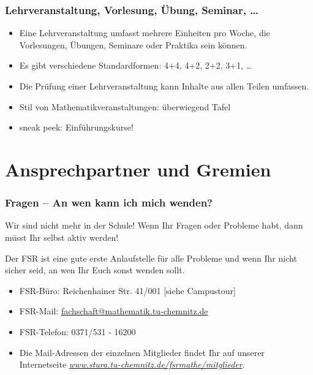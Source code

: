 \documentclass[10pt]{beamer}
\begin{document}
\begin{frame}
\frametitle{Lehrveranstaltung, Vorlesung, Übung, Seminar, \ldots}
\begin{itemize}
	\item Eine Lehrveranstaltung umfasst mehrere Einheiten pro Woche, die Vorlesungen, Übungen, Seminare oder Praktika sein können. 
	\item Es gibt verschiedene Standardformen: 4+4, 4+2, 2+2, 3+1, \ldots
	\item Die Prüfung einer Lehrveranstaltung kann Inhalte aus allen Teilen umfassen.
	\item Stil von Mathematikveranstaltungen: überwiegend Tafel
	\item sneak peek: Einführungskurse!
\end{itemize}
\end{frame}

\section{Ansprechpartner und Gremien}
\frame{\tableofcontents[currentsection]}

\begin{frame}
\frametitle{Fragen -- An wen kann ich mich wenden?}
Wir sind nicht mehr in der Schule! Wenn Ihr Fragen oder Probleme habt, dann müsst Ihr selbst aktiv werden!
\begin{block}{\vphantom{X}}
	Der FSR ist eine gute erste Anlaufstelle für alle Probleme und wenn Ihr nicht sicher seid, an wen Ihr Euch sonst wenden sollt.
\end{block}
\begin{itemize}
	\item FSR-Büro: Reichenhainer Str. 41/001 [siehe Campustour]
	\item FSR-Mail: \href{mailto:fachschaft@mathematik.tu-chemnitz.de}{fachschaft@mathematik.tu-chemnitz.de} 
	\item FSR-Telefon: 0371/531 - 16200
	\item Die Mail-Adressen der einzelnen Mitglieder findet Ihr auf unserer Internetseite \textit{\href{https://www.stura.tu-chemnitz.de/fsrmathe/mitglieder}{www.stura.tu-chemnitz.de/fsrmathe/mitglieder}}.
\end{itemize}
\end{frame}
\end{document}
